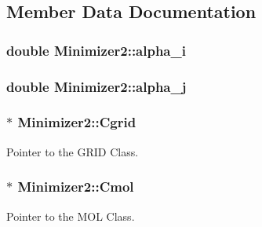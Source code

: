 \subsection{Member Data Documentation}
\hypertarget{classMinimizer2_aa446d4997e158501ce036b559904952e}{
\subsubsection[{alpha\_\-i}]{\setlength{\rightskip}{0pt plus 5cm}double {\bf Minimizer2::alpha\_\-i}}}
\label{classMinimizer2_aa446d4997e158501ce036b559904952e}
\hypertarget{classMinimizer2_a5907490bde60e76d02217390e32a66eb}{
\subsubsection[{alpha\_\-j}]{\setlength{\rightskip}{0pt plus 5cm}double {\bf Minimizer2::alpha\_\-j}}}
\label{classMinimizer2_a5907490bde60e76d02217390e32a66eb}
\hypertarget{classMinimizer2_a82909d2dd56fc9747ae6edbe94b2e5d2}{
\subsubsection[{Cgrid}]{ $\ast$ {\bf Minimizer2::Cgrid}}}
\label{classMinimizer2_a82909d2dd56fc9747ae6edbe94b2e5d2}


Pointer to the GRID Class. 

\hypertarget{classMinimizer2_af79d496194cba04903627d821f0faca3}{
\subsubsection[{Cmol}]{ $\ast$ {\bf Minimizer2::Cmol}}}
\label{classMinimizer2_af79d496194cba04903627d821f0faca3}


Pointer to the MOL Class. 

